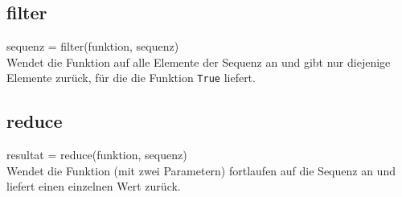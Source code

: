 \subsection{filter}
sequenz = filter(funktion, sequenz)\\
Wendet die Funktion auf alle Elemente der Sequenz an und gibt nur diejenige Elemente zurück, für die die Funktion \texttt{True} liefert.


\subsection{reduce}
resultat = reduce(funktion, sequenz)\\
Wendet die Funktion (mit zwei Parametern) fortlaufen auf die Sequenz an und liefert einen einzelnen Wert zurück.
